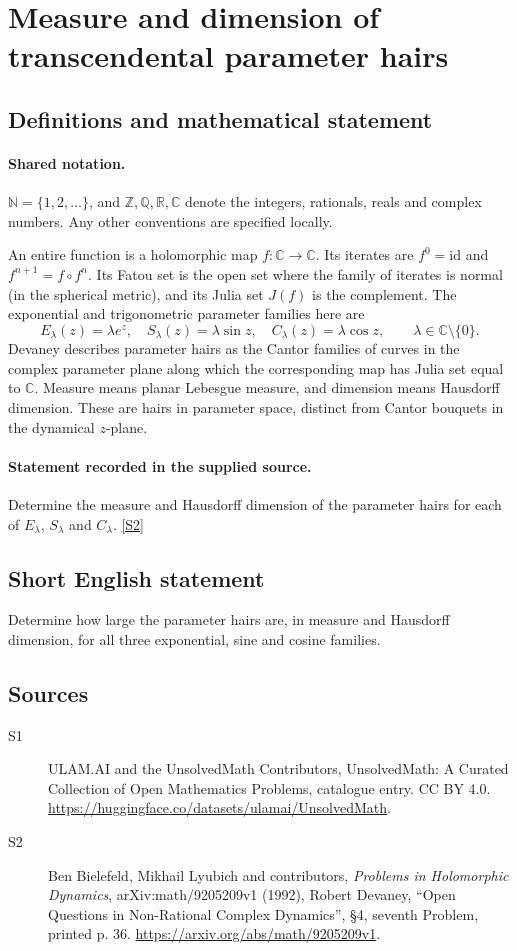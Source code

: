 \documentclass[11pt]{article}
\newcommand{\sref}[2]{\hyperlink{source:#1:#2}{[S#2]}}
\begin{document}
\section{Measure and dimension of transcendental parameter hairs}\label{statement}

\subsection{Definitions and mathematical statement}

\paragraph{Shared notation.}$\mathbb N=\{1,2,\ldots\}$, and $\mathbb Z,\mathbb Q,\mathbb R,\mathbb C$ denote the integers, rationals, reals and complex numbers. Any other conventions are specified locally.


An entire function is a holomorphic map $f:\mathbb C\to\mathbb C$. Its iterates are $f^0=\mathrm{id}$ and $f^{n+1}=f\circ f^n$. Its Fatou set is the open set where the family of iterates is normal (in the spherical metric), and its Julia set $J(f)$ is the complement. The exponential and trigonometric parameter families here are
\[E_\lambda(z)=\lambda e^z,\quad S_\lambda(z)=\lambda\sin z,\quad C_\lambda(z)=\lambda\cos z,\qquad \lambda\in\mathbb C\setminus\{0\}.\]Devaney describes parameter hairs as the Cantor families of curves in the complex parameter plane along which the corresponding map has Julia set equal to $\mathbb C$. Measure means planar Lebesgue measure, and dimension means Hausdorff dimension. These are hairs in parameter space, distinct from Cantor bouquets in the dynamical $z$-plane.
\paragraph{Statement recorded in the supplied source.}
Determine the measure and Hausdorff dimension of the parameter hairs for each of $E_\lambda$, $S_\lambda$ and $C_\lambda$. \sref{statement}{2}
\subsection{Short English statement}
Determine how large the parameter hairs are, in measure and Hausdorff dimension, for all three exponential, sine and cosine families.
\subsection{Sources}
\begin{description}
\item[\hypertarget{source:statement:1}{S1}] ULAM.AI and the UnsolvedMath Contributors, UnsolvedMath: A Curated Collection of Open Mathematics Problems, catalogue entry. CC BY 4.0. \url{https://huggingface.co/datasets/ulamai/UnsolvedMath}.
\item[\hypertarget{source:statement:2}{S2}] Ben Bielefeld, Mikhail Lyubich and contributors, \emph{Problems in Holomorphic Dynamics}, arXiv:math/9205209v1 (1992), Robert Devaney, ``Open Questions in Non-Rational Complex Dynamics'', \S4, seventh Problem, printed p. 36. \url{https://arxiv.org/abs/math/9205209v1}.
\end{description}
\label{end:statement}
\end{document}
